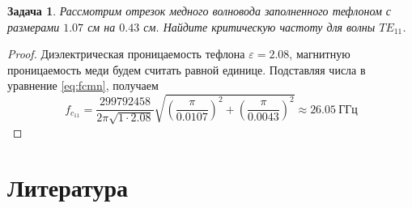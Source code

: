 \documentclass[a4paper,12pt]{article}
\newtheorem{problem}{Задача}
\newenvironment{solution}{\renewcommand{\proofname}{\unskip\indent\nopunct}\begin{proof}}{\end{proof}}
\numberwithin{equation}{section}
\begin{document}
\begin{problem}
{\normalfont \cite[p.~116, Example 3.1]{Pozar:882338}}
Рассмотрим отрезок медного волновода заполненного тефлоном с размерами $1.07$ см на $0.43$ см.
Найдите критическую частоту для волны $TE_{11}$.
\end{problem}
\begin{solution}
Диэлектрическая проницаемость тефлона $\varepsilon = 2.08$, магнитную проницаемость меди будем считать равной единице.
Подставляя числа в уравнение \ref{eq:fcmn}, получаем
\begin{equation}
    f_{c_11} = \frac{299 792 458}{2 \pi \sqrt{1 \cdot 2.08}} \sqrt{\left(\frac{\pi}{0.0107}\right)^2 + \left(\frac{\pi}{0.0043}\right)^2} \approx 26.05~\text{ГГц}
\end{equation}

\end{solution}



\section{Литература}
\renewcommand\refname{\vskip -1cm}


\end{document}
